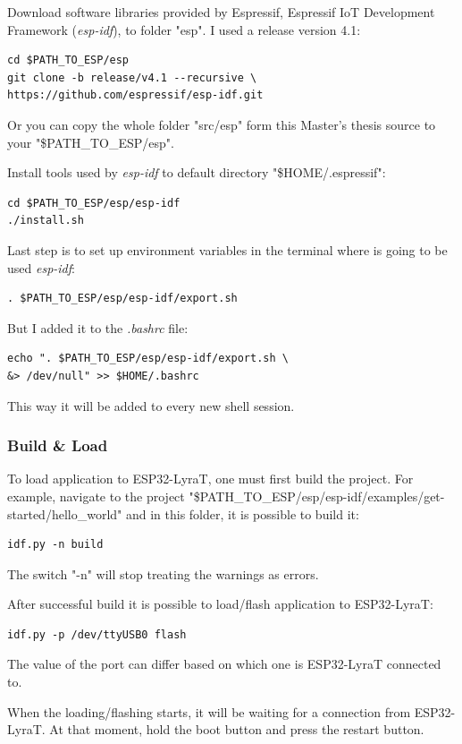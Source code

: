 \documentclass[thesis=M,english]{FITthesis}[2019/12/23]
\begin{document}
\bigskip
\noindent
Download software libraries provided by Espressif, Espressif IoT Development Framework (\textit{esp-idf}), to folder "esp". I used a release version 4.1:
\begin{lstlisting}[frame=single]
cd $PATH_TO_ESP/esp
git clone -b release/v4.1 --recursive \
https://github.com/espressif/esp-idf.git
\end{lstlisting}
Or you can copy the whole folder "src/esp" form this Master's thesis source to your "\$PATH\_TO\_ESP/esp".

\bigskip
\noindent
Install tools used by \textit{esp-idf} to default directory "\$HOME/.espressif":
\begin{lstlisting}[frame=single]
cd $PATH_TO_ESP/esp/esp-idf
./install.sh
\end{lstlisting}

\bigskip
\noindent
Last step is to set up environment variables in the terminal where is going to be used \textit{esp-idf}:
\begin{lstlisting}[frame=single]
. $PATH_TO_ESP/esp/esp-idf/export.sh
\end{lstlisting}
But I added it to the \textit{.bashrc} file:
\begin{lstlisting}[frame=single]
echo ". $PATH_TO_ESP/esp/esp-idf/export.sh \
&> /dev/null" >> $HOME/.bashrc
\end{lstlisting}
This way it will be added to every new shell session.

\subsubsection{Build \& Load}
To load application to ESP32-LyraT, one must first build the project. For example, navigate to the project "\$PATH\_TO\_ESP/esp/esp-idf/examples/get-started/hello\_world" and in this folder, it is possible to build it:
\begin{lstlisting}[frame=single]
idf.py -n build
\end{lstlisting}
The switch "-n" will stop treating the warnings as errors.

\bigskip
\noindent
After successful build it is possible to load/flash application to ESP32-LyraT:
\begin{lstlisting}[frame=single]
idf.py -p /dev/ttyUSB0 flash
\end{lstlisting}
The value of the port can differ based on which one is ESP32-LyraT connected to.

\bigskip
\noindent
When the loading/flashing starts, it will be waiting for a connection from ESP32-LyraT. At that moment, hold the boot button and press the restart button.
\end{document}
